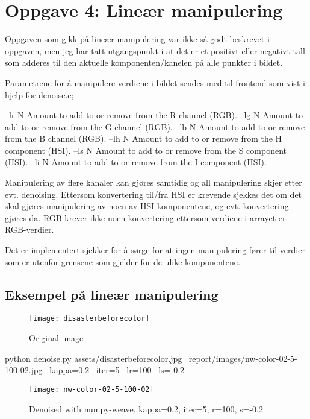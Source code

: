 \section*{Oppgave 4: Lineær manipulering}

Oppgaven som gikk på lineær manipulering var ikke så godt beskrevet i oppgaven, men jeg har tatt utgangspunkt i at det er et positivt eller negativt tall som adderes til den aktuelle komponenten/kanelen på alle punkter i bildet.

Parametrene for å manipulere verdiene i bildet sendes med til frontend som vist i hjelp for denoise.c;

--lr N  Amount to add to or remove from the R channel (RGB).
--lg N  Amount to add to or remove from the G channel (RGB).
--lb N  Amount to add to or remove from the B channel (RGB).
--lh N  Amount to add to or remove from the H component (HSI).
--ls N  Amount to add to or remove from the S component (HSI).
--li N  Amount to add to or remove from the I component (HSI).

Manipulering av flere kanaler kan gjøres samtidig og all manipulering skjer etter evt. denoising. Ettersom konvertering til/fra HSI er krevende sjekkes det om det skal gjøres manipulering av noen av HSI-komponentene, og evt. konvertering gjøres da. RGB krever ikke noen konvertering ettersom verdiene i arrayet er RGB-verdier.

Det er implementert sjekker for å sørge for at ingen manipulering fører til verdier som er utenfor grensene som gjelder for de ulike komponentene.

\subsection*{Eksempel på lineær manipulering}
\begin{figure}[!h]
\centering
\texttt{[image: disasterbeforecolor]}
\caption{Original image}
\end{figure}

\pagebreak

python denoise.py assets/disasterbeforecolor.jpg \
report/images/nw-color-02-5-100-02.jpg --kappa=0.2 --iter=5 --lr=100 --ls=-0.2

\begin{figure}[!h]
\centering
\texttt{[image: nw-color-02-5-100-02]}
\caption{Denoised with numpy-weave, kappa=0.2, iter=5, r=100, s=-0.2}
\end{figure}

\pagebreak